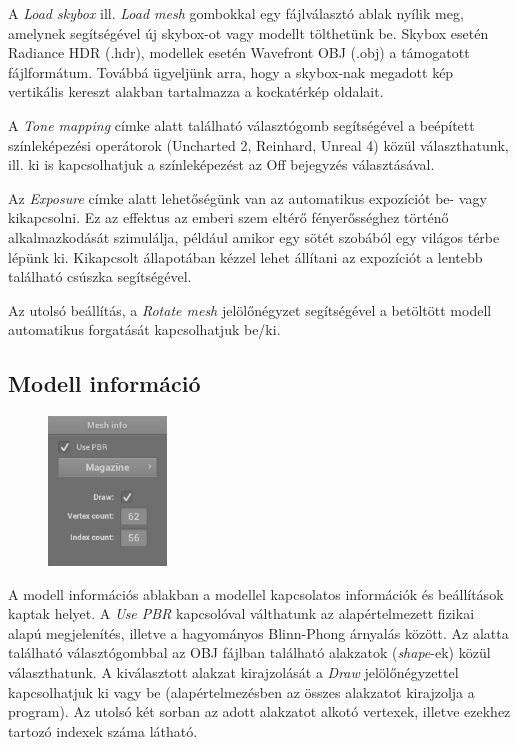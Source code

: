 A \textit{Load skybox} ill. \textit{Load mesh} gombokkal egy fájlválasztó ablak nyílik meg, amelynek segítségével új skybox-ot vagy modellt tölthetünk be. Skybox esetén Radiance HDR (.hdr), modellek esetén Wavefront OBJ (.obj) a támogatott fájlformátum. Továbbá ügyeljünk arra, hogy a skybox-nak megadott kép vertikális kereszt alakban tartalmazza a kockatérkép oldalait.

A \textit{Tone mapping} címke alatt található választógomb segítségével a beépített színleképezési operátorok (Uncharted 2, Reinhard, Unreal 4) közül választhatunk, ill. ki is kapcsolhatjuk a színleképezést az Off bejegyzés választásával.

Az \textit{Exposure} címke alatt lehetőségünk van az automatikus expozíciót be- vagy kikapcsolni. Ez az effektus az emberi szem eltérő fényerősséghez történő alkalmazkodását szimulálja, például amikor egy sötét szobából egy világos térbe lépünk ki. Kikapcsolt állapotában kézzel lehet állítani az expozíciót a lentebb található csúszka segítségével.

Az utolsó beállítás, a \textit{Rotate mesh} jelölőnégyzet segítségével a betöltött modell automatikus forgatását kapcsolhatjuk be/ki.

\subsection{Modell információ}

\begin{figure}
    \vspace{-23pt}
    \includegraphics[width=0.28\textwidth]{images/mesh_info.png}
    \vspace{-20pt}
\end{figure}

A modell információs ablakban a modellel kapcsolatos információk és beállítások kaptak helyet. A \textit{Use PBR} kapcsolóval válthatunk az alapértelmezett fizikai alapú megjelenítés, illetve a hagyományos Blinn-Phong árnyalás között. Az alatta található választógombbal az OBJ fájlban található alakzatok (\textit{shape}-ek) közül választhatunk. A kiválasztott alakzat kirajzolását a \textit{Draw} jelölőnégyzettel kapcsolhatjuk ki vagy be (alapértelmezésben az összes alakzatot kirajzolja a program). Az utolsó két sorban az adott alakzatot alkotó vertexek, illetve ezekhez tartozó indexek száma látható.


